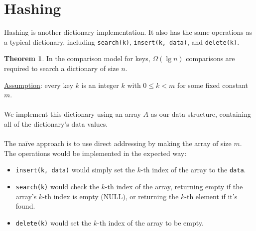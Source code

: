 \documentclass[]{article}
\theoremstyle{definition}
\newtheorem*{theorem}{Theorem}
\begin{document}
	\section{Hashing}
		Hashing is another dictionary implementation. It also has the same operations as a typical dictionary, including \verb+search(k)+, \verb+insert(k, data)+, and \verb+delete(k)+.

		\begin{theorem}
			In the comparison model for keys, $\Omega(\lg n)$ comparisons are required to search a dictionary of size $n$.
		\end{theorem}

		\underline{Assumption}: every key $k$ is an integer $k$ with $0 \le k < m$ for some fixed constant $m$.
		\\ \\
		We implement this dictionary using an array $A$ as our data structure, containing all of the dictionary's data values.
		\\ \\
		The na\"ive approach is to use direct addressing by making the array of size $m$. The operations would be implemented in the expected way:
		\begin{itemize}
			\item \verb+insert(k, data)+ would simply set the $k$-th index of the array to the \verb+data+.
			\item \verb+search(k)+ would check the $k$-th index of the array, returning empty if the array's $k$-th index is empty (NULL), or returning the $k$-th element if it's found.
			\item \verb+delete(k)+ would set the $k$-th index of the array to be empty.
		\end{itemize}
\end{document}

